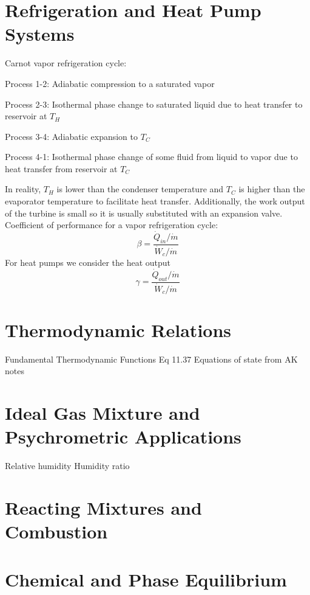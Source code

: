 \documentclass[paper=letter, fontsize=11pt]{scrartcl}
\numberwithin{equation}{section}        %
\numberwithin{figure}{section}          %
\numberwithin{table}{section}               %
\begin{document}
\newpage
\section{Refrigeration and Heat Pump Systems}

Carnot vapor refrigeration cycle:

Process 1-2: Adiabatic compression to a saturated vapor

Process 2-3: Isothermal phase change to saturated liquid due to heat transfer to reservoir at $T_H$

Process 3-4: Adiabatic expansion to $T_C$

Process 4-1: Isothermal phase change of some fluid from liquid to vapor due to heat transfer from reservoir at $T_C$

In reality, $T_H$ is lower than the condenser temperature and $T_C$ is higher than the evaporator temperature to facilitate heat transfer. Additionally, the work output of the turbine is small so it is usually substituted with an expansion valve.
\newline
\newline
Coefficient of performance for a vapor refrigeration cycle:
\begin{equation}
    \beta = \frac{\dot Q_{in}/\dot m}{\dot W_c/\dot m}
\end{equation}
\newline
\newline
For heat pumps we consider the heat output
\begin{equation}
    \gamma = \frac{\dot Q_{out}/\dot m}{\dot W_c/\dot m}
\end{equation}

\newpage
\section{Thermodynamic Relations}

Fundamental Thermodynamic Functions Eq 11.37
Equations of state from AK notes


\newpage
\section{Ideal Gas Mixture and Psychrometric Applications}

Relative humidity
Humidity ratio


\newpage
\section{Reacting Mixtures and Combustion}

\section{Chemical and Phase Equilibrium}

\end{document}

